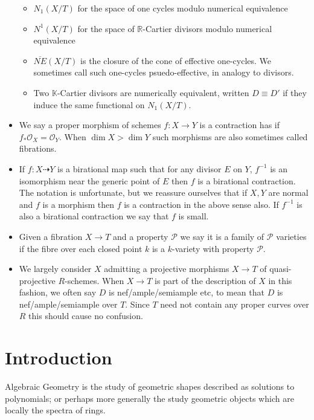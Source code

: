 \documentclass[a4paper,12pt]{book}
\newcommand{\ox}[1][X]{\mathcal{O}_{#1}}
\begin{document}
\begin{itemize}
\begin{itemize}
			\item $N_{1}(X/T)$ for the space of one cycles modulo numerical equivalence
			\item $N^{1}(X/T)$ for the space of $\mathbb{R}$-Cartier divisors modulo numerical equivalence
			\item $\overline{NE}(X/T)$ is the closure of the cone of effective one-cycles. We sometimes call such one-cycles psuedo-effective, in analogy to divisors.
			\item Two $\mathbb{K}$-Cartier divisors are numerically equivalent, written $D \equiv D'$ if they induce the same functional on $N_{1}(X/T)$.
		\end{itemize}
		\item We say a proper morphism of schemes $f\colon X \to Y$ is a contraction has if $f_{*}\ox=\ox[Y]$. When $\dim X > \dim Y$ such morphisms are also sometimes called fibrations.
		\item If $f \colon X \dashrightarrow Y$ is a birational map such that for any divisor $E$ on $Y$, $f^{-1}$ is an isomorphism near the generic point of $E$ then $f$ is a birational contraction. The notation is unfortunate, but we reassure ourselves that if $X,Y$ are normal and $f$ is a morphism then $f$ is a contraction in the above sense also. If $f^{-1}$ is also a birational contraction we say that $f$ is small.  
		\item Given a fibration $X \to T$ and a property $\mathcal{P}$ we say it is a family of $\mathcal{P}$ varieties if the fibre over each closed point $k$ is a $k$-variety with property $\mathcal{P}$.
		\item We largely consider $X$ admitting a projective morphisms $X\to T$ of quasi-projective $R$-schemes. When $X \to T$ is part of the description of $X$ in this fashion, we often say $D$ is nef/ample/semiample etc, to mean that $D$ is nef/ample/semiample over $T$. Since $T$ need not contain any proper curves over $R$ this should cause no confusion.
		
		
		
	\end{itemize}
	
	\chapter{Introduction}

	Algebraic Geometry is the study of geometric shapes described as solutions to polynomials; or perhaps more generally the study geometric objects which are locally the spectra of rings.
	
\end{document}
